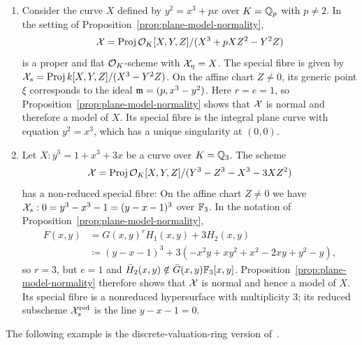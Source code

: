\begin{example}\label{ex:particular-model-of-plane-curve}
    \begin{enumerate}[label=\textup{(\alph*)}]
        \item
          Consider the curve $X$ defined by $y^2 = x^3 + px$ over $K=\mathbb Q_p$ with $p \neq 2$. In the setting of Proposition~\ref{prop:plane-model-normality},
          \[
            \mathcal X = \operatorname{Proj}{\mathcal O_K[X,Y,Z]/(X^3 + pXZ^2 - Y^2Z)}
          \]
          is a proper and flat $\mathcal O_K$-scheme with $\mathcal X_\eta = X$. The special fibre is given by $\mathcal X_s = \operatorname{Proj}{k[X,Y,Z]/(X^3 - Y^2Z)}$. On the affine chart $Z\neq 0$, its generic point $\xi$ corresponds to the ideal $\mathfrak m = (p, x^3-y^2)$. Here $r=e=1$, so Proposition~\ref{prop:plane-model-normality} shows that $\mathcal X$ is normal and therefore a model of $X$. Its special fibre is the integral plane curve with equation $y^2=x^3$, which has a unique singularity at $(0,0)$.
        \item Let $X: y^3 = 1 + x^3 + 3x$ be a curve over $K=\mathbb Q_3$.
            The scheme
            \begin{align}
                \mathcal X = \operatorname{Proj}{\mathcal O_K[X,Y,Z]/(Y^3 - Z^3 - X^3 - 3XZ^2)}
            \end{align}
            has a non-reduced special fibre:
            On the affine chart $Z \neq 0$ we have $\mathcal X_s: 0 = y^3 - x^3 - 1 = (y - x - 1)^3$ over $\mathbb F_3$.
            In the notation of Proposition~\ref{prop:plane-model-normality},
            \begin{align*}
                F(x,y) &= G(x,y)^r H_1(x,y) + 3 H_2(x,y) \\
                    &\coloneqq (y-x-1)^3 + 3(-x^2y + xy^2 + x^2 - 2xy + y^2 - y),
            \end{align*}
            so $r=3$, but $e=1$ and $\bar{H}_2(x,y) \notin \bar{G}(x,y)\mathbb F_3[x,y]$.
            Proposition~\ref{prop:plane-model-normality} therefore shows that $\mathcal X$ is normal and hence a model of $X$. Its special fibre is a nonreduced hypersurface with multiplicity $3$; its reduced subscheme $\mathcal X_s^{\mathrm{red}}$ is the line $y-x-1=0$.
    \end{enumerate}
\end{example}

The following example is the discrete-valuation-ring version of~\cite[Example \textrm{III}.9.8.4]{Hartshorne}.

